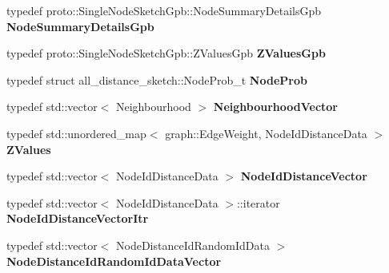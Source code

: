 \begin{DoxyCompactItemize}
\item 
\hypertarget{namespaceall__distance__sketch_ad8c3eac40af697c88f1f50bd46d985ec}{}typedef proto\+::\+Single\+Node\+Sketch\+Gpb\+::\+Node\+Summary\+Details\+Gpb {\bfseries Node\+Summary\+Details\+Gpb}\label{namespaceall__distance__sketch_ad8c3eac40af697c88f1f50bd46d985ec}

\item 
\hypertarget{namespaceall__distance__sketch_ac8383ac987018a0d79298578de7207db}{}typedef proto\+::\+Single\+Node\+Sketch\+Gpb\+::\+Z\+Values\+Gpb {\bfseries Z\+Values\+Gpb}\label{namespaceall__distance__sketch_ac8383ac987018a0d79298578de7207db}

\item 
\hypertarget{namespaceall__distance__sketch_afe1012f59c9acefad48d9c8b254f62da}{}typedef struct all\+\_\+distance\+\_\+sketch\+::\+Node\+Prob\+\_\+t {\bfseries Node\+Prob}\label{namespaceall__distance__sketch_afe1012f59c9acefad48d9c8b254f62da}

\item 
\hypertarget{namespaceall__distance__sketch_a1b6c1bccb4c2618347ee06c820a5ab9d}{}typedef std\+::vector$<$ Neighbourhood $>$ {\bfseries Neighbourhood\+Vector}\label{namespaceall__distance__sketch_a1b6c1bccb4c2618347ee06c820a5ab9d}

\item 
\hypertarget{namespaceall__distance__sketch_a96b3e5630ae959843fca081c4accb419}{}typedef std\+::unordered\+\_\+map$<$ graph\+::\+Edge\+Weight, Node\+Id\+Distance\+Data $>$ {\bfseries Z\+Values}\label{namespaceall__distance__sketch_a96b3e5630ae959843fca081c4accb419}

\item 
\hypertarget{namespaceall__distance__sketch_a21b129900de9d9cfbb3406f7e0d1a75a}{}typedef std\+::vector$<$ Node\+Id\+Distance\+Data $>$ {\bfseries Node\+Id\+Distance\+Vector}\label{namespaceall__distance__sketch_a21b129900de9d9cfbb3406f7e0d1a75a}

\item 
\hypertarget{namespaceall__distance__sketch_aeb3aa8f88e2ff80d4625d227ad385dae}{}typedef std\+::vector$<$ Node\+Id\+Distance\+Data $>$\+::iterator {\bfseries Node\+Id\+Distance\+Vector\+Itr}\label{namespaceall__distance__sketch_aeb3aa8f88e2ff80d4625d227ad385dae}

\item 
\hypertarget{namespaceall__distance__sketch_aba91dd69245d43d635e9aa605e31d85e}{}typedef std\+::vector$<$ Node\+Distance\+Id\+Random\+Id\+Data $>$ {\bfseries Node\+Distance\+Id\+Random\+Id\+Data\+Vector}\label{namespaceall__distance__sketch_aba91dd69245d43d635e9aa605e31d85e}


\end{DoxyCompactItemize}
